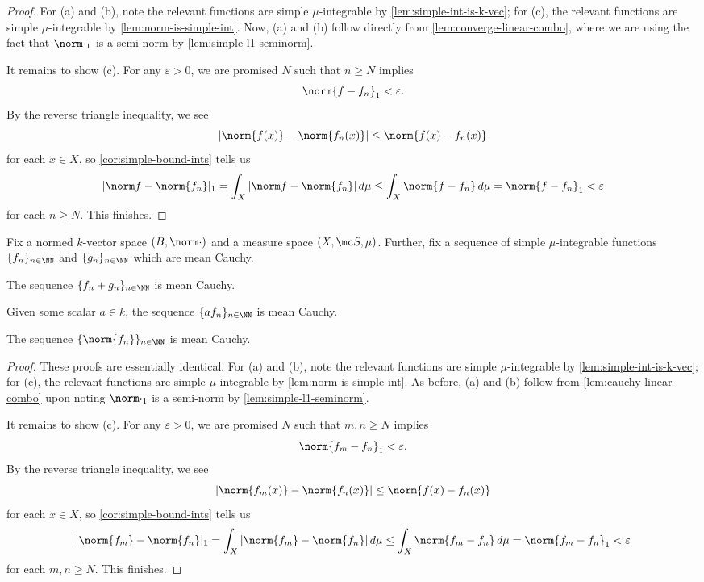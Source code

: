 \documentclass[../notes.tex]{subfiles}
\begin{document}
\begin{proof}
	For (a) and (b), note the relevant functions are simple $\mu$-integrable by \autoref{lem:simple-int-is-k-vec}; for (c), the relevant functions are simple $\mu$-integrable by \autoref{lem:norm-is-simple-int}. Now, (a) and (b) follow directly from \autoref{lem:converge-linear-combo}, where we are using the fact that $\norm\cdot_1$ is a semi-norm by \autoref{lem:simple-l1-seminorm}.
	
	It remains to show (c). For any $\varepsilon>0$, we are promised $N$ such that $n\ge N$ implies
	\[\norm{f-f_n}_1<\varepsilon.\]
	By the reverse triangle inequality, we see
	\[|\norm{f(x)}-\norm{f_n(x)}|\le\norm{f(x)-f_n(x)}\]
	for each $x\in X$, so \autoref{cor:simple-bound-ints} tells us
	\[|\norm f-\norm{f_n}|_1=\int_X|\norm f-\norm{f_n}|\,d\mu\le\int_X\norm{f-f_n}\,d\mu=\norm{f-f_n}_1<\varepsilon\]
	for each $n\ge N$. This finishes.
\end{proof}
\begin{lemma} \label{lem:linear-combo-mean-cauchy}
	Fix a normed $k$-vector space $(B,\norm\cdot)$ and a measure space $(X,\mc S,\mu)$. Further, fix a sequence of simple $\mu$-integrable functions $\{f_n\}_{n\in\NN}$ and $\{g_n\}_{n\in\NN}$ which are mean Cauchy.
	\begin{listalph}
		\item The sequence $\{f_n+g_n\}_{n\in\NN}$ is mean Cauchy.
		\item Given some scalar $a\in k$, the sequence $\{af_n\}_{n\in\NN}$ is mean Cauchy.
		\item The sequence $\{\norm{f_n}\}_{n\in\NN}$ is mean Cauchy.
	\end{listalph}
\end{lemma}
\begin{proof}
	These proofs are essentially identical. For (a) and (b), note the relevant functions are simple $\mu$-integrable by \autoref{lem:simple-int-is-k-vec}; for (c), the relevant functions are simple $\mu$-integrable by \autoref{lem:norm-is-simple-int}. As before, (a) and (b) follow from \autoref{lem:cauchy-linear-combo} upon noting $\norm\cdot_1$ is a semi-norm by \autoref{lem:simple-l1-seminorm}.

	It remains to show (c). For any $\varepsilon>0$, we are promised $N$ such that $m,n\ge N$ implies
	\[\norm{f_m-f_n}_1<\varepsilon.\]
	By the reverse triangle inequality, we see
	\[|\norm{f_m(x)}-\norm{f_n(x)}|\le\norm{f(x)-f_n(x)}\]
	for each $x\in X$, so \autoref{cor:simple-bound-ints} tells us
	\[|\norm {f_m}-\norm{f_n}|_1=\int_X|\norm {f_m}-\norm{f_n}|\,d\mu\le\int_X\norm{{f_m}-f_n}\,d\mu=\norm{f_m-f_n}_1<\varepsilon\]
	for each $m,n\ge N$. This finishes.
\end{proof}
\end{document}
